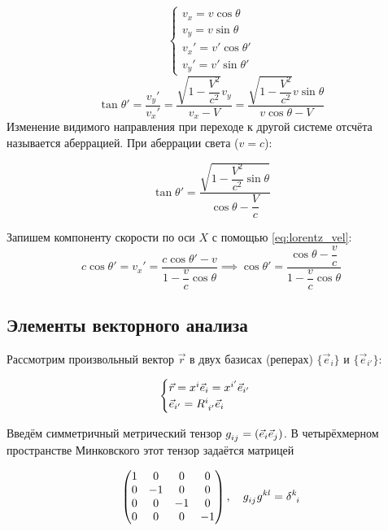 \documentclass{article}
\begin{document}
\begin{equation*}
    \begin{cases}
    v_x=v\cos{\theta}\\
    v_y=v\sin{\theta}\\
    v_x'=v'\cos{\theta'}\\
    v_y'=v'\sin{\theta'}
    \end{cases}
\end{equation*}
\begin{equation*}
    \tan{\theta'}=\dfrac{v_y'}{v_x'}=\dfrac{\sqrt{1-\dfrac{V^2}{c^2}}v_y}{v_x-V}=\dfrac{\sqrt{1-\dfrac{V^2}{c^2}}v\sin{\theta}}{v\cos{\theta}-V}
\end{equation*}
Изменение видимого направления при переходе к другой системе отсчёта называется аберрацией. При аберрации света ($v=c$):

\begin{equation*}
    \tan{\theta'}=\dfrac{\sqrt{1-\dfrac{V^2}{c^2}\sin{\theta}}}{\cos{\theta}-\dfrac{V}{c}}
\end{equation*}

Запишем компоненту скорости по оси $X$ с помощью \eqref{eq:lorentz_vel}:
\begin{equation*}
    c\cos{\theta'}=v_x'=\dfrac{c\cos{\theta'}-v}{1-\dfrac{v}{c}\cos{\theta}}
    \implies \cos{\theta'}=\dfrac{\cos{\theta}-\dfrac{v}{c}}{1-\dfrac{v}{c}\cos{\theta}}
\end{equation*}

\subsection{Элементы векторного анализа}

Рассмотрим произвольный вектор $\vec{r}$ в двух базисах (реперах) $\{\vec{e}_i\}$ и $\{\vec{e}_{i'}\}$:

\begin{equation}\label{eq:bases}
    \begin{cases}
    \vec{r}=\tensor{x}{^i}\vec{e}_i=\tensor{x}{^{i'}}\vec{e}_{i'}\\
    \vec{e}_{i'}=\tensor{R}{^i_{i'}}\vec{e}_i
    \end{cases}
\end{equation}

Введём симметричный метрический тензор $\tensor{g}{_i_j}=\left(\vec{e}_i\vec{e}_j\right)$. В четырёхмерном пространстве Минковского этот тензор задаётся матрицей 

\begin{equation*}
    \begin{pmatrix}
    1 & 0 & 0 & 0 \\
    0 & -1 & 0 & 0 \\
    0 & 0 & -1 & 0 \\
    0 & 0 & 0 & -1
    \end{pmatrix},\quad
    \tensor{g}{_i_j}\tensor{g}{^k^l}=\tensor{\delta}{^k_i}
\end{equation*}
\end{document}
